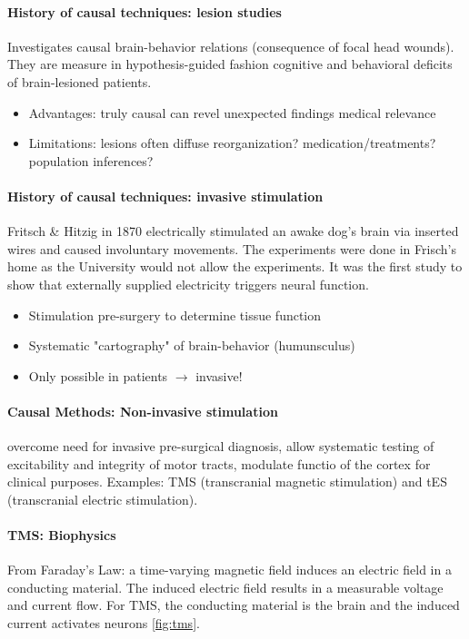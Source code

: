 \documentclass[12pt,article,oneside,a4paper]{memoir}
\begin{document}
\paragraph{History of causal techniques: lesion studies } Investigates causal brain-behavior relations (consequence of focal head wounds). They are measure in hypothesis-guided fashion cognitive and behavioral deficits of brain-lesioned patients.

\begin{itemize}
\item Advantages:
\subitem truly causal
\subitem can revel unexpected findings
\subitem medical relevance
\item Limitations:
\subitem lesions often diffuse
\subitem reorganization?
\subitem medication/treatments?
\subitem population inferences?
\end{itemize}

\paragraph{History of causal techniques: invasive stimulation} Fritsch \& Hitzig in 1870 electrically stimulated an awake dog's brain via inserted wires and caused involuntary movements. The experiments were done in Frisch's home as the University would not allow the experiments. It was the first study to show that externally supplied electricity triggers neural function.

\begin{itemize}
\item Stimulation pre-surgery to determine tissue function
\item Systematic "cartography" of brain-behavior (humunsculus)
\item Only possible in patients $\rightarrow$ invasive!
\end{itemize}

\paragraph{Causal Methods: Non-invasive stimulation} overcome need for invasive pre-surgical diagnosis, allow systematic testing of excitability and integrity of motor tracts, modulate functio of the cortex for clinical purposes. Examples: TMS (transcranial magnetic stimulation) and tES (transcranial electric stimulation).

\paragraph{TMS: Biophysics} From Faraday's Law: a time-varying magnetic field induces an electric field in a conducting material. The induced electric field results in a measurable voltage and current flow. For TMS, the conducting material is the brain and the induced current activates neurons \ref{fig:tms}.
\end{document}
